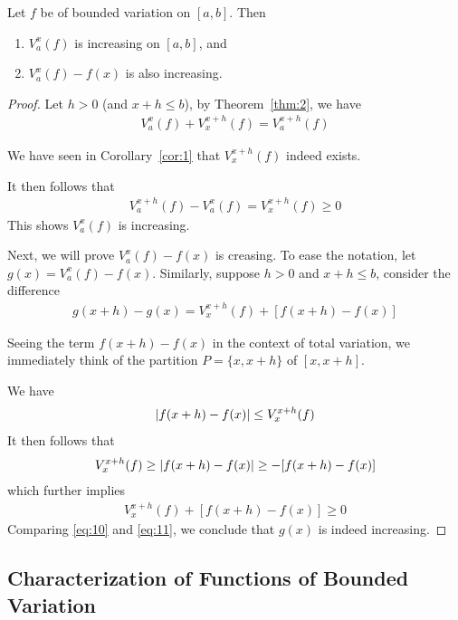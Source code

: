 \documentclass[thmcnt=section, color=blue, 12pt]{my-elegantbook}
\begin{document}
\begin{theorem} \label{thm:3}
	Let $f$ be of bounded variation on $[a, b]$.
	Then
	\begin{enumerate}
		\item $V_a^x(f)$ is increasing on $[a, b]$, and
		\item $V_a^x(f) - f(x)$ is also increasing.
	\end{enumerate}
\end{theorem}

\begin{proof}
	Let $h > 0$ (and $x + h \leq b$), by Theorem~\ref{thm:2}, we have
	\begin{align*}
		V_a^x (f) + V_x^{x+h} (f) = V_a^{x+h} (f)
	\end{align*}
	\begin{note}
		We have seen in Corollary~\ref{cor:1} that $V_x^{x+h}(f)$ indeed exists.
	\end{note}
	It then follows that
	\begin{align*}
		V_a^{x+h}(f) - V_a^{x}(f) = V_x^{x+h}(f) \geq 0
	\end{align*}
	This shows $V_a^x(f)$ is increasing.

	Next, we will prove $V_a^x(f) - f(x)$ is creasing.
	To ease the notation, let $g(x) = V_a^x(f) - f(x)$.
	Similarly, suppose $h > 0$ and $x + h \leq b$,
	consider the difference
	\begin{align}
		g(x+h) - g(x)
		= V_x^{x+h}(f) + [f(x+h) - f(x)]
		\label{eq:10}
	\end{align}
	\begin{note}
		Seeing the term $f(x+h) - f(x)$ in the context of total variation,
		we immediately think of the partition $P = \{x, x+h\}$ of $[x, x+h]$.
	\end{note}
	We have
	\begin{align*}
		\left\lvert f(x+h) - f(x) \right\rvert \leq V_x^{x+h}(f)
	\end{align*}
	It then follows that
	\begin{align*}
		V_x^{x+h}(f) \geq \left\lvert f(x+h) - f(x) \right\rvert \geq -[f(x+h) - f(x)]
	\end{align*}
	which further implies
	\begin{align}
		V_x^{x+h}(f) + [f(x+h) - f(x)] \geq 0
		\label{eq:11}
	\end{align}
	Comparing \eqref{eq:10} and \eqref{eq:11}, we conclude
	that $g(x)$ is indeed increasing.
\end{proof}

\subsection{Characterization of Functions of Bounded Variation}
\end{document}
